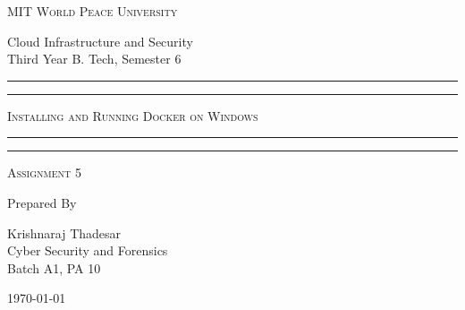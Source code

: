 \documentclass[11pt]{article}
\begin{document}
\begin{titlepage}
    \centering


    \huge\textsc{
        MIT World Peace University
    }\\

    \vspace{0.75\baselineskip} %

    \LARGE{
        Cloud Infrastructure and Security\\
        Third Year B. Tech, Semester 6
    }

    \vfill %


    \rule{\textwidth}{1.6pt}\vspace*{-\baselineskip}\vspace*{2pt}
    \rule{\textwidth}{0.6pt}
    \vspace{0.75\baselineskip} %



    \huge{\textsc{
            Installing and Running Docker on Windows
        }} \\



    \vspace{0.5\baselineskip} %
    \rule{\textwidth}{0.6pt}\vspace*{-\baselineskip}\vspace*{2.8pt}
    \rule{\textwidth}{1.6pt}

    \vspace{1\baselineskip} %


    \LARGE\textsc{
        Assignment 5
    } %
    \vfill


    Prepared By
    \vspace{0.5\baselineskip} %

    \Large{
        Krishnaraj Thadesar \\
        Cyber Security and Forensics\\
        Batch A1, PA 10
    }


    \vspace{0.5\baselineskip} %
    \today

\end{titlepage}
\end{document}
